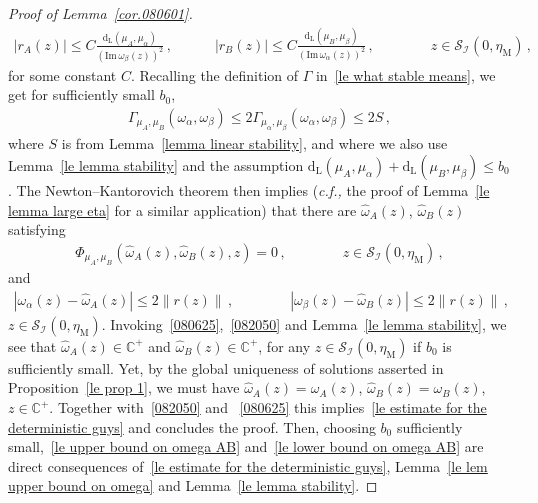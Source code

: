 \documentclass[10pt,reqno]{amsart}
\numberwithin{equation}{section}
\theoremstyle{plain}
\numberwithin{kevin}{section}
\theoremstyle{remark}
\newcommand{\im}{\mathrm{Im}\,}
\newcommand{\C}{{\mathbb C}}
\newcommand{\cf}{\emph{c.f., }}
\newcommand{\PP}{\Phi}
\newcommand{\dL}{\mathrm{d}_{\mathrm{L}}}
\begin{document}
\begin{proof}[Proof of Lemma~\ref{cor.080601}]
 \begin{align} \label{080625}
  |r_A(z)| \le C\frac{\dL(\mu_A,\mu_\alpha)}{(\im \omega_\beta(z))^2}\,,\quad\qquad|r_B(z)|\le C\frac{\dL(\mu_B,\mu_\beta)}{(\im \omega_\alpha(z))^2}\,,\qquad\qquad z\in\mathcal{S}_{\mathcal{I}}(0,\eta_{\mathrm{M}})\,,
 \end{align}
 for some constant $C$. Recalling the definition of $\Gamma$ in~\eqref{le what stable means}, we get for sufficiently small $b_0$,
 \begin{align}\label{zhigang today}
\Gamma_{\mu_A,\mu_B}(\omega_\alpha,\omega_\beta)\leq 2 \Gamma_{\mu_\alpha,\mu_\beta}(\omega_\alpha,\omega_\beta)\leq 2S\,,
 \end{align}
 where $S$ is from Lemma~\ref{lemma linear stability}, and where we also use Lemma~\ref{le lemma stability} and the assumption $\dL(\mu_A,\mu_\alpha)+\dL(\mu_{B},\mu_\beta)\le b_0$. The Newton--Kantorovich theorem then implies (\cf the proof of Lemma~\ref{le lemma large eta} for a similar application) that there are $\widehat{\omega}_A(z)$, $\widehat{\omega}_B(z)$ satisfying
 \begin{align}
  \PP_{\mu_A,\mu_B}(\widehat{\omega}_A(z),\widehat{\omega}_B(z),z)=0\,,\qquad\qquad z\in\mathcal{S}_{\mathcal{I}}(0,\eta_{\mathrm{M}})\,,
 \end{align}
and
 \begin{align}
 |\omega_\alpha(z)-\widehat{\omega}_A(z)|\leq 2 \|r(z)\|\,,\qquad \qquad  |\omega_\beta(z)-\widehat{\omega}_B(z)|\leq 2 \|r(z)\|\,,\label{082050}
 \end{align}
 $z\in\mathcal{S}_{\mathcal{I}}(0,\eta_{\mathrm{M}})$. Invoking~\eqref{080625},~\eqref{082050} and Lemma~\ref{le lemma stability}, we see that $\widehat{\omega}_A(z)\in\C^+$ and $\widehat{\omega}_B(z)\in\C^+$, for any $z\in\mathcal{S}_{\mathcal{I}}(0,\eta_{\mathrm{M}})$ if $b_0$ is sufficiently small. Yet, by the global uniqueness of solutions asserted in Proposition~\ref{le prop 1}, we must have $\widehat\omega_A(z)=\omega_A(z)$, $\widehat\omega_B(z)=\omega_B(z)$, $z\in\C^+$. Together with~\eqref{082050} and  ~\eqref{080625} this  implies~\eqref{le estimate for the deterministic guys} and concludes the proof. Then, choosing $b_0$ sufficiently small,~\eqref{le upper bound on omega AB} and~\eqref{le lower bound on omega AB} are direct consequences of~\eqref{le estimate for the deterministic guys}, Lemma~\ref{le lem upper bound on omega} and Lemma~\ref{le lemma stability}.\qedhere

\end{proof}
\end{document}
